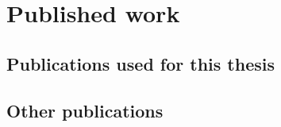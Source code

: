 \chapter{Published work}

\section*{Publications used for this thesis}


\nocite{parallelintime,tn,bruteforce,railwaydispatching,omnisolver,pyqbench}
\printbibliography[heading=none,keyword=my-used]


\section*{Other publications}
\printbibliography[heading=none,keyword=my-unused]

